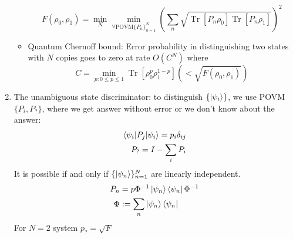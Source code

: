 \documentclass[11pt,a4paper]{article}%
\numberwithin{equation}{section}
\newcommand{\Tr}{\operatorname{Tr}}
\begin{document}
\begin{enumerate}
\begin{itemize}
            \begin{equation}
                F(\rho_0,\rho_1) = \min_N \min_{\forall \mbox{POVM}\{P_n\}_{n=1}^N}\left(\sum_n \sqrt{\Tr[P_n\rho_0]\Tr[P_n\rho_1]}\right)^2
            \end{equation}
            \item Quantum Chernoff bound: Error probability in distinguishing two states with $N$ copies goes to zero at rate $O(C^N)$ where 
            \begin{equation}
                C = \min_{p:0\le p\le 1}\Tr[\rho_0^p\rho_1^{1-p}] (<\sqrt{F(\rho_0,\rho_1)})
            \end{equation}
        \end{itemize}
        \item The unambiguous state discriminator: to distinguish $\{\ket{\psi_i}\}$, we use POVM $\{ P_i, P_?\}$, where we get answer without error or we don't know about the answer:
        \begin{align}
            \braket{\psi_i|P_j|\psi_i} = p_i\delta_{ij}\\
            P_? = I - \sum_i P_i
        \end{align}
        It is possible if and only if $\{\ket{\psi_n}\}_{n=1}^N$ are linearly independent.
        \begin{align}
            P_n &= p\Phi^{-1}\ket{\psi_n}\bra{\psi_n}\Phi^{-1}\\
            \Phi&:= \sum_n\ket{\psi_n}\bra{\psi_n}
        \end{align}
        For $N=2$ system $p_? = \sqrt F$
    \end{enumerate}
\end{document}
